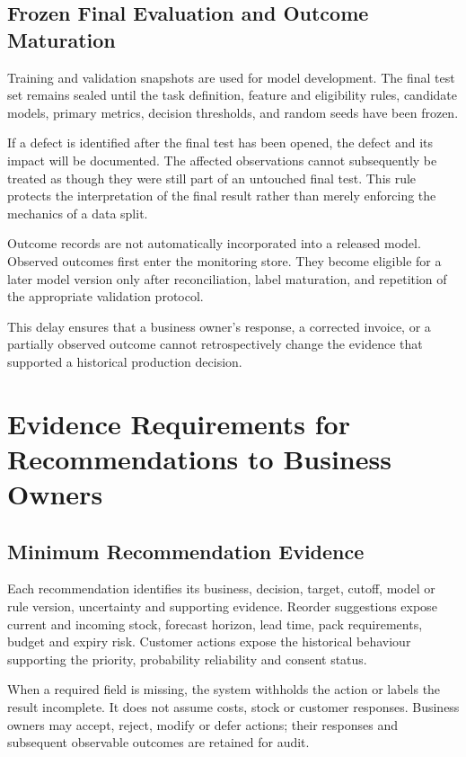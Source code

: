 \documentclass[a4paper,11pt,oneside]{book}
\theoremstyle{plain}
\theoremstyle{definition}
\theoremstyle{remark}
\begin{document}
\subsection{Frozen Final Evaluation and Outcome Maturation}
\label{subsec:frozen_evaluation}

Training and validation snapshots are used for model development. The final test
set remains sealed until the task definition, feature and eligibility rules,
candidate models, primary metrics, decision thresholds, and random seeds have
been frozen.

If a defect is identified after the final test has been opened, the defect and
its impact will be documented. The affected observations cannot subsequently be
treated as though they were still part of an untouched final test. This rule
protects the interpretation of the final result rather than merely enforcing the
mechanics of a data split.

Outcome records are not automatically incorporated into a released model.
Observed outcomes first enter the monitoring store. They become eligible for a
later model version only after reconciliation, label maturation, and repetition
of the appropriate validation protocol.

This delay ensures that a business owner's response, a corrected invoice, or a partially
observed outcome cannot retrospectively change the evidence that supported a
historical production decision.


\section{Evidence Requirements for Recommendations to Business Owners}
\label{sec:recommendation_contract}

\subsection{Minimum Recommendation Evidence}
Each recommendation identifies its business, decision, target, cutoff,
model or rule version, uncertainty and supporting evidence. Reorder
suggestions expose current and incoming stock, forecast horizon, lead time,
pack requirements, budget and expiry risk. Customer actions expose the
historical behaviour supporting the priority, probability reliability and
consent status.

When a required field is missing, the system withholds the action or labels
the result incomplete. It does not assume costs, stock or customer responses.
Business owners may accept, reject, modify or defer actions; their responses
and subsequent observable outcomes are retained for audit.
\end{document}
